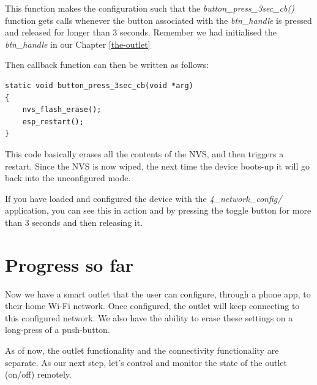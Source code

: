 \documentclass[main.tex]{subfiles}
\begin{document}
This function makes the configuration such that the \textit{button\_press\_3sec\_cb()} function gets calls whenever the button associated with the \textit{btn\_handle} is pressed and released for longer than 3 seconds. Remember we had initialised the \textit{btn\_handle} in our Chapter \ref{the-outlet}

Then callback function can then be written as follows:
\begin{verbatim}
static void button_press_3sec_cb(void *arg)
{
    nvs_flash_erase();
    esp_restart();
}
\end{verbatim}

This code basically erases all the contents of the NVS, and then triggers a restart. Since the NVS is now wiped, the next time the device boots-up it will go back into the unconfigured mode. 

If you have loaded and configured the device with the \textit{4\_network\_config/} application, you can see this in action and by pressing the toggle button for more than 3 seconds and then releasing it.

\section{Progress so far}
Now we have a smart outlet that the user can configure, through a phone app, to their home Wi-Fi network. Once configured, the outlet will keep connecting to this configured network. We also have the ability to erase these settings on a long-press of a push-button.

As of now, the outlet functionality and the connectivity functionality are separate. As our next step, let's control and monitor the state of the outlet (on/off) remotely.
\end{document}
